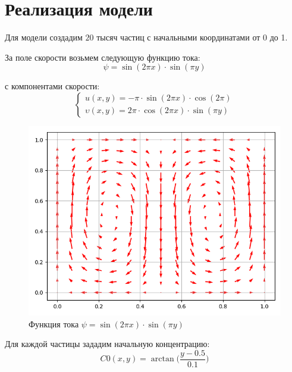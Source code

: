 \documentclass[a4paper, 14pt]{extarticle}
\begin{document}
	\section{Реализация модели}	
		Для модели создадим $20$ тысяч частиц с начальными координатами от 0 до 1.
		
		За поле скорости возьмем следующую функцию тока:
		\[ \psi = \sin(2\pi x) \cdot \sin(\pi y) \]
		
		с компонентами скорости:
		\[ \begin{cases}
			u (x, y) = -\pi \cdot \sin{(2\pi x)} \cdot \cos{(2\pi)} \\[7pt]
			\upsilon (x, y) = 2\pi \cdot \cos{(2\pi x)} \cdot \sin{(\pi y)} 
		\end{cases} \]
		
		\begin{figure}[H]
			\centering
			\includegraphics[width = .5\linewidth]{11.png}
			\caption[.] {Функция тока $\psi = \sin(2\pi x) \cdot \sin(\pi y)$}
		\end{figure}
		
		Для каждой частицы зададим начальную концентрацию:
		\[ C0(x, y) = \arctan{\Bigg(\dfrac{y-0.5}{0.1}\Bigg)} \]
			
\end{document}
